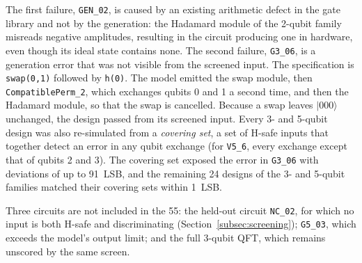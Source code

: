 \documentclass[conference]{IEEEtran}
\begin{document}


The first failure, \texttt{GEN\_02}, is caused by an existing arithmetic
defect in the gate library and not by the generation: the Hadamard module of
the 2-qubit family misreads negative amplitudes, resulting in the circuit producing one
in hardware, even though its ideal state contains none. The second failure, \texttt{G3\_06}, is a generation error that was not visible from the screened input. The specification is \texttt{swap(0,1)} followed by \texttt{h(0)}. The model emitted the swap module, then
\texttt{CompatiblePerm\_2}, which exchanges qubits 0 and 1 a second time,
and then the Hadamard module, so that the swap is cancelled. Because a swap
leaves $|000\rangle$ unchanged, the design passed from its screened input.
Every 3- and 5-qubit design was also re-simulated from a \emph{covering
set}, a set of H-safe inputs that together detect an error in any qubit
exchange (for \texttt{V5\_6}, every exchange except that of qubits 2 and 3).
The covering set exposed the error in \texttt{G3\_06} with deviations of up
to 91~LSB, and the remaining 24 designs of the 3- and 5-qubit families
matched their covering sets within 1~LSB.

Three circuits are not included in the 55: the held-out circuit
\texttt{NC\_02}, for which no input is both H-safe and discriminating
(Section~\ref{subsec:screening}); \texttt{G5\_03}, which exceeds the model's output
limit; and the full 3-qubit QFT, which remains unscored by the same screen.


\end{document}
